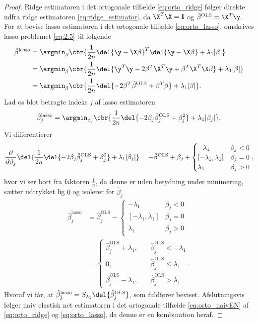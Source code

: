 \begin{proof}
Ridge estimatoren i det ortogonale tilfælde \eqref{eq:orto_ridge} følger direkte udfra ridge estimatoren \eqref{eq:ridge_estimator}, da \(\X^T \X = \mathbf{I}\) og \(\hat{\beta}^\text{OLS} = \X^T \y\).
For at bevise lasso estimatoren i det ortogonale tilfælde \eqref{eq:orto_lasso}, omskrives lasso problemet \eqref{eq:2.5} til følgende
\begin{align*}
\hat{\beta}^\text{lasso} &= \argmin_{\beta} \cbr{\frac{1}{2n} \del{\y - \X \beta}^T \del{\y - \X \beta} + \lambda_1 \vert \beta \vert} \\
&= \argmin_{\beta} \cbr{\frac{1}{2n} \del{\y^T \y - 2 \beta^T \X^T \y + \beta^T \X^T \X \beta} + \lambda_1 \vert \beta \vert} \\
&= \argmin_{\beta} \cbr{\frac{1}{2n} \del{ - 2 \beta^T \hat{\beta}^\text{OLS} + \beta^T \beta} + \lambda_1 \vert \beta \vert}.
\end{align*}
Lad os blot betragte indeks \(j\) af lasso estimatoren
\begin{align*}
\hat{\beta}_j^\text{lasso} = \argmin_{\beta_j} \cbr{\frac{1}{2n} \del{ - 2 \beta_j \hat{\beta}_j^\text{OLS} + \beta_j^2} + \lambda_1 \vert \beta_j \vert}.
\end{align*}
Vi differentierer
\begin{align*}
\frac{\partial}{\partial \beta_j} \del{\frac{1}{2n} \del{ - 2 \beta_j \hat{\beta}_j^\text{OLS} + \beta_j^2} + \lambda_1 \vert \beta_j \vert}
=-\hat{\beta}^\text{OLS} + \beta_j + \begin{cases}
-\lambda_1 \quad &\beta_j < 0 \\
[-\lambda_1, \lambda_1] & \beta_j = 0 \\
\lambda_1 & \beta_j >0 
\end{cases},
\end{align*}
hvor vi ser bort fra faktoren \(\frac{1}{n}\), da denne er uden betydning under minimering, sætter udtrykket lig \(0\) og isolerer for \(\hat{\beta}_j\)
\begin{align*}
\hat{\beta}_j^\text{lasso} &= \hat{\beta}_j^\text{OLS} - \begin{cases}
-\lambda_1 \quad &\beta_j < 0 \\
[-\lambda_1, \lambda_1] & \beta_j = 0 \\
\lambda_1 & \beta_j >0 
\end{cases} \\
&= \begin{cases}
\hat{\beta}_j^\text{OLS} + \lambda_1, \quad &\hat{\beta}_j^\text{OLS} < - \lambda_1 \\
0, &\hat{\beta}_j^\text{OLS} \leq \lambda_1 \\
\hat{\beta}_j^\text{OLS} - \lambda_1, \quad &\hat{\beta}_j^\text{OLS} > \lambda_1
\end{cases}. 
\end{align*}
Hvoraf vi får, at \(\hat{\beta}_j^\text{lasso} = S_{\lambda_1} \del{ \hat{\beta}_j^\text{OLS}} \), som fuldfører beviset.
Afslutningsvis følger naiv elastisk net estimatoren i det ortogonale tilfælde \eqref{eq:orto_naivEN} af \eqref{eq:orto_ridge} og \eqref{eq:orto_lasso}, da denne er en kombination heraf.
\end{proof}

